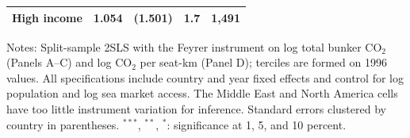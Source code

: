 \documentclass[12pt]{extarticle}
\begin{document}
\begin{table}[H]
{\begin{threeparttable}
\begin{tabular}{lcccc}
  High income & 1.054 & (1.501) & 1.7 & 1,491 \\
\bottomrule
\end{tabular}
\begin{tablenotes}[flushleft]
\footnotesize
\item Notes: Split-sample 2SLS with the Feyrer instrument on log total bunker CO$_2$ (Panels A--C) and log CO$_2$ per seat-km (Panel D); terciles are formed on 1996 values. All specifications include country and year fixed effects and control for log population and log sea market access. The Middle East and North America cells have too little instrument variation for inference. Standard errors clustered by country in parentheses. $^{***}$, $^{**}$, $^{*}$: significance at 1, 5, and 10 percent.
\end{tablenotes}
\end{threeparttable}}
\end{table}
\end{document}
